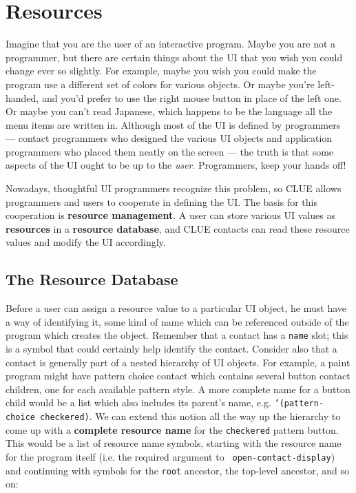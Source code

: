 \section{Resources\label{sec:resources}}
Imagine that you are the user of an interactive program. Maybe you are
not a programmer, but there are certain things about the UI that you
wish you could change ever so slightly. For example, maybe you wish you
could make the program use a different set of colors for various
objects. Or maybe you're left-handed, and you'd prefer to use the right
mouse button in place of the left one. Or maybe you can't read Japanese,
which happens to be the language all the menu items are written in.
Although most of the UI is defined by programmers  --- contact
programmers who designed the various UI objects and application
programmers who placed them neatly on the screen --- the truth is that
some aspects of the UI ought to be up to the {\em user}. Programmers,
keep your hands off!

Nowadays, thoughtful UI programmers recognize this problem, so CLUE
allows  programmers and users to cooperate in
defining the UI. The basis for this cooperation is {\bf resource
management}. A user can store various UI values as {\bf
resources} in a {\bf resource database}, and CLUE contacts can read these resource values and modify
the UI accordingly. 

\subsection{The Resource Database}
Before a user can assign a resource value to a particular UI object, he
must have a way of identifying it, some kind of  name which
can be referenced outside of the program which creates the object.
Remember that a contact has a {\tt name} slot; this
is a symbol that could certainly help identify the contact. Consider
also that a contact is generally part of a nested hierarchy of UI
objects. For example, a paint program might have pattern choice
contact which contains several button contact children, one for each available
pattern style. A more complete name for a button child would be a
list which also includes its parent's name, e.g. {\tt '(pattern-choice
checkered)}. We can extend this notion all the way up the hierarchy to
come up with a {\bf complete resource name} for the {\tt checkered} pattern button. This would be a list of
resource name symbols, starting with the resource name for the program
itself (i.e. the required argument to {\tt
open-contact-display}) and continuing with
symbols for the {\tt root} ancestor, the top-level ancestor,
and so on:

